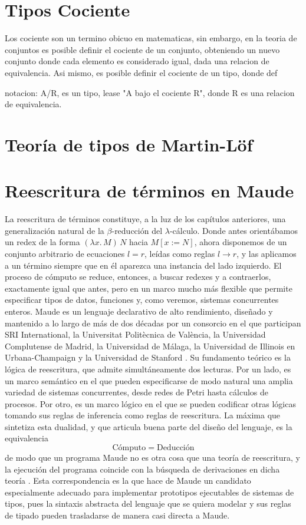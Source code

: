 \documentclass[a4paper,12pt]{report}
\theoremstyle{definition}
\theoremstyle{plain}
\theoremstyle{remark}
\begin{document}
    \section{Tipos Cociente}
    Los cociente son un termino obicuo en matematicas, sin embargo, en la teoria de conjuntos es posible definir el cociente de un conjunto, obteniendo un nuevo conjunto donde cada elemento es considerado igual, dada una relacion de equivalencia. Asi mismo, es posible definir el cociente de un tipo, donde def


    notacion: A/R, es un tipo, lease "A bajo el cociente R", donde R es una relacion de equivalencia.
    \section{Teoría de tipos de Martin-Löf}
\section{Reescritura de t\'erminos en Maude}
La reescritura de t\'erminos constituye, a la luz de los cap\'itulos anteriores, una generalizaci\'on natural de la $\beta$-reducci\'on del $\lambda$-c\'alculo. Donde antes orient\'abamos un redex de la forma $(\lambda x.\, M)\, N$ hacia $M[x := N]$, ahora disponemos de un conjunto arbitrario de ecuaciones $l = r$, le\'idas como reglas $l \to r$, y las aplicamos a un t\'ermino siempre que en \'el aparezca una instancia del lado izquierdo. El proceso de c\'omputo se reduce, entonces, a buscar redexes y a contraerlos, exactamente igual que antes, pero en un marco mucho m\'as flexible que permite especificar tipos de datos, funciones y, como veremos, sistemas concurrentes enteros.
\newline
\newline
Maude es un lenguaje declarativo de alto rendimiento, dise\~nado y mantenido a lo largo de m\'as de dos d\'ecadas por un consorcio en el que participan SRI International, la Universitat Polit\`ecnica de Val\`encia, la Universidad Complutense de Madrid, la Universidad de M\'alaga, la Universidad de Illinois en Urbana-Champaign y la Universidad de Stanford \citep{duran2019, clavel2007}. Su fundamento te\'orico es la l\'ogica de reescritura, que admite simult\'aneamente dos lecturas. Por un lado, es un marco sem\'antico en el que pueden especificarse de modo natural una amplia variedad de sistemas concurrentes, desde redes de Petri hasta c\'alculos de procesos. Por otro, es un marco l\'ogico en el que se pueden codificar otras l\'ogicas tomando sus reglas de inferencia como reglas de reescritura. La m\'axima que sintetiza esta dualidad, y que articula buena parte del dise\~no del lenguaje, es la equivalencia
\[
\text{C\'omputo} \;=\; \text{Deducci\'on}
\]
de modo que un programa Maude no es otra cosa que una teor\'ia de reescritura, y la ejecuci\'on del programa coincide con la b\'usqueda de derivaciones en dicha teor\'ia \citep{clavel2007}. Esta correspondencia es la que hace de Maude un candidato especialmente adecuado para implementar prototipos ejecutables de sistemas de tipos, pues la sintaxis abstracta del lenguaje que se quiera modelar y sus reglas de tipado pueden trasladarse de manera casi directa a Maude.
\end{document}
